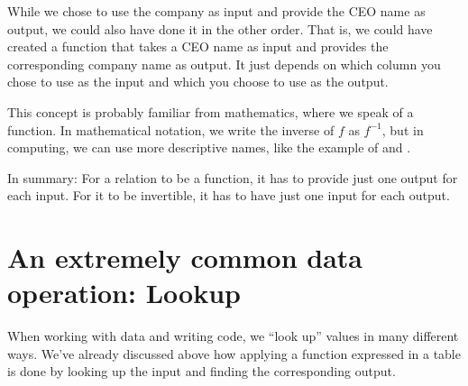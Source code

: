 \documentclass[letterpaper,10pt,english]{sphinxmanual}
\begin{document}
While we chose to use the company as input and provide the CEO name as output, we could also have done it in the other order.  That is, we could have created a function  that takes a CEO name as input and provides the corresponding company name as output.  It just depends on which column you chose to use as the input and which you choose to use as the output.

This concept is probably familiar from mathematics, where we speak of  a function.  In mathematical notation, we write the inverse of \(f\) as \(f^{-1}\), but in computing, we can use more descriptive names, like the example of  and .

In summary:  For a relation to be a function, it has to provide just one output for each input.  For it to be invertible, it has to have just one input for each output.


\section{An extremely common data operation: Lookup}
\label{\detokenize{chapter-2-mathematical-foundations:an-extremely-common-data-operation-lookup}}
When working with data and writing code, we “look up” values in many different ways.  We’ve already discussed above how applying a function expressed in a table is done by looking up the input and finding the corresponding output.
\end{document}

